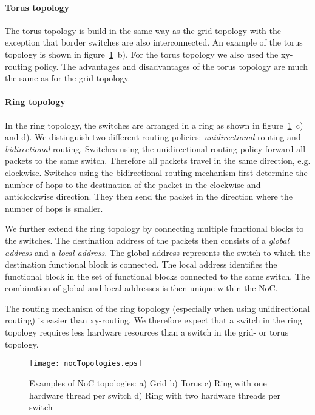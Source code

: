 \paragraph{Torus topology}
The torus topology is build in the same way as the grid topology with the exception that border switches are also interconnected. An example of the torus topology is shown in figure~\ref{nocTopologies.eps}~b). For the torus topology we also used the xy-routing policy. The advantages and disadvantages of the torus topology are much the same as for the grid topology.

\paragraph{Ring topology}
In the ring topology, the switches are arranged in a ring as shown in figure~\ref{nocTopologies.eps}~c) and d). We distinguish two different routing policies: \textit{unidirectional} routing and \textit{bidirectional} routing. Switches using the unidirectional routing policy forward all packets to the same switch. Therefore all packets travel in the same direction, e.g. clockwise. Switches using the bidirectional routing mechanism first determine the number of hops to the destination of the packet in the clockwise and anticlockwise direction. They then send the packet in the direction where the number of hops is smaller.

We further extend the ring topology by connecting multiple functional blocks to the switches. The destination address of the packets then consists of a \textit{global address} and a \textit{local address}. The global address represents the switch to which the destination functional block is connected. The local address identifies the functional block in the set of functional blocks connected to the same switch. The combination of global and local addresses is then unique within the NoC.

The routing mechanism of the ring topology (especially when using unidirectional routing) is easier than xy-routing. We therefore expect that a switch in the ring topology requires less hardware resources than a switch in the grid- or torus topology.

\begin{figure}
  \begin{center}
		 \texttt{[image: nocTopologies.eps]}
  \caption{Examples of NoC topologies: a) Grid b) Torus c) Ring with one hardware thread per switch d) Ring with two hardware threads per switch}
  \label{nocTopologies.eps}
  \end{center}
\end{figure}

